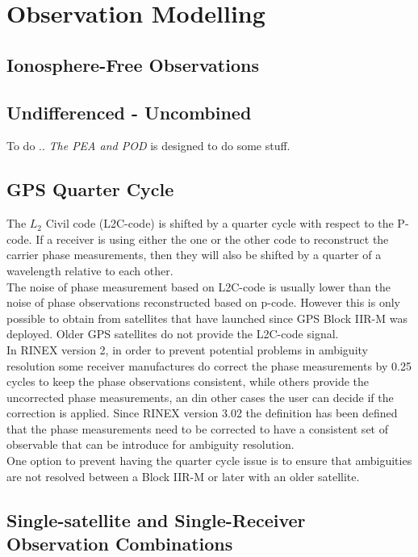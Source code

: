 \chapter{Observation Modelling}
\label{ch:observation_modelling}

\section{Ionosphere-Free Observations}

\section{Undifferenced - Uncombined}
To do ..
\textit{The PEA and POD} is designed to do some stuff.

\section{GPS Quarter Cycle}
The $L_2$ Civil code (L2C-code) is shifted by a quarter cycle with respect to the P-code. If a receiver is using either the one or the other code to reconstruct the carrier phase measurements, then they will also be shifted by a quarter of a wavelength relative to each other.\\
The noise of phase measurement based on L2C-code is usually lower than the noise of phase observations reconstructed based on p-code. However this is only possible to obtain from satellites that have launched since GPS Block IIR-M was deployed. Older GPS satellites do not provide the L2C-code signal.\\
In RINEX version 2, in order to prevent potential problems in ambiguity resolution some receiver manufactures do correct the phase measurements by 0.25 cycles to keep the phase observations consistent, while others provide the uncorrected phase measurements, an din other cases the user can decide if the correction is applied. Since RINEX version 3.02 the definition has been defined that the phase measurements need to be corrected to have a consistent set of observable that can be introduce for ambiguity resolution.\\
One option to prevent having the quarter cycle issue is to ensure that ambiguities are not resolved between a Block IIR-M or later  with an older satellite.

\section{Single-satellite and Single-Receiver Observation Combinations}

